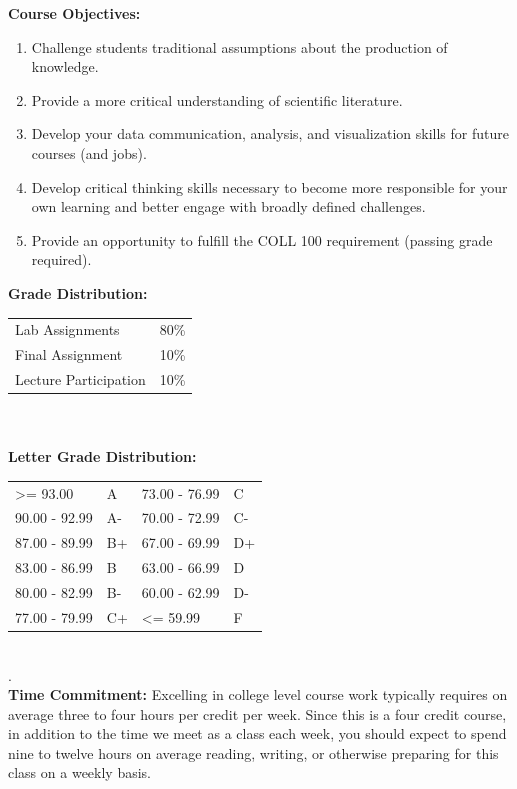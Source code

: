 \documentclass[11pt]{article}
\begin{document}
\vspace{8mm}

\textbf {\large Course Objectives:} 
\begin{enumerate} \itemsep-0.4em
  \item Challenge students traditional assumptions about the production of knowledge.
  \item Provide a more critical understanding of scientific literature.
  \item Develop your data communication, analysis, and visualization skills for future courses (and jobs).
  \item Develop critical thinking skills necessary to become more responsible for your own learning and better engage with broadly defined challenges.
  \item Provide an opportunity to fulfill the COLL 100 requirement (passing grade required).
\end{enumerate}
\vspace{8mm}

\textbf {\large Grade Distribution:} \\
\hspace*{40mm}
\begin{tabular}{ l l }
Lab Assignments & 80\% \\
Final Assignment & 10\% \\
Lecture Participation  & 10\% \\
\end{tabular} \\\\

\textbf {\large Letter Grade Distribution:} \\
\hspace*{40mm}
\begin{tabular}{ l l | l l }
\textgreater= 93.00 & A & 73.00 - 76.99 & C \\
90.00 - 92.99 & A-  & 70.00 - 72.99 & C- \\
87.00 - 89.99 & B+  & 67.00 - 69.99 & D+ \\
83.00 - 86.99 & B  & 63.00 - 66.99 & D \\
80.00 - 82.99 & B-  & 60.00 - 62.99 & D- \\
77.00 - 79.99 & C+  & \textless= 59.99 & F \\
\end{tabular} \\
.\\
\textbf {\large Time Commitment:} Excelling in college level course work typically requires on average three to four hours per credit per week.  Since this is a four credit course, in addition to the time we meet as a class each week, you should expect to spend nine to twelve hours on average reading, writing, or otherwise preparing for this class on a weekly basis.\\
\end{document}
